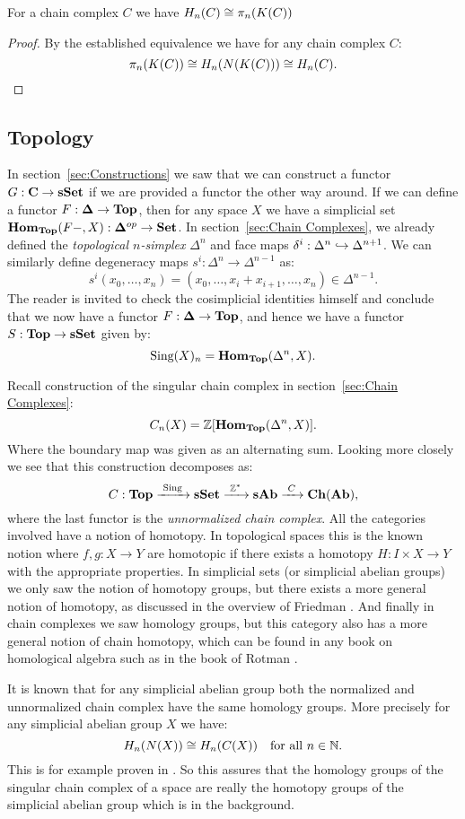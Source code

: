 \begin{corollary}
	For a chain complex $C$ we have $H_n(C) \cong \pi_n(K(C))$
\end{corollary}
\begin{proof}
	By the established equivalence we have for any chain complex $C$:
	$$ \pi_n(K(C)) \cong H_n(N(K(C))) \cong H_n(C). $$
\end{proof}

\subsection{Topology}
In section~\ref{sec:Constructions} we saw that we can construct a functor $G: \mathbf{C} \to \mathbf{sSet}$ if we are provided a functor the other way around. If we can define a functor $F: \mathbf{\Delta} \to \mathbf{Top}$, then for any space $X$ we have a simplicial set $\mathbf{Hom}_{\mathbf{Top}}(F-, X): \mathbf{\Delta}^{op} \to \mathbf{Set}$. In section~\ref{sec:Chain Complexes}, we already defined the \emph{topological $n$-simplex} $\Delta^n$ and face maps $\delta^i : \Delta^n \hookrightarrow \Delta^{n+1}$. We can similarly define degeneracy maps $s^i: \Delta^n \to \Delta^{n-1}$ as:
$$ s^i(x_0, \ldots, x_n) = (x_0, \ldots, x_i + x_{i+1}, \ldots, x_n) \in \Delta^{n-1}. $$
The reader is invited to check the cosimplicial identities himself and conclude that we now have a functor $F: \mathbf{\Delta} \to \mathbf{Top}$, and hence we have a functor $S: \mathbf{Top} \to \mathbf{sSet}$ given by:
$$ \text{Sing}(X)_n = \mathbf{Hom}_{\mathbf{Top}}(\Delta^n, X). $$

Recall construction of the singular chain complex in section~\ref{sec:Chain Complexes}:
$$ C_n(X) = \mathbb{Z}[\mathbf{Hom}_{\mathbf{Top}}(\Delta^n, X)]. $$
Where the boundary map was given as an alternating sum. Looking more closely we see that this construction decomposes as:
$$ C: \mathbf{Top} \xrightarrow{\,\,{\text{Sing}}\,\,} \mathbf{sSet} \xrightarrow{\,\,{\mathbb{Z}^\ast}\,\,} \mathbf{sAb} \xrightarrow{\,\,{C}\,\,} \mathbf{Ch}(\mathbf{Ab}), $$
where the last functor is the \emph{unnormalized chain complex}. All the categories involved have a notion of homotopy. In topological spaces this is the known notion where $f, g:X \to Y$ are homotopic if there exists a homotopy $H:I \times X \to Y$ with the appropriate properties. In simplicial sets (or simplicial abelian groups) we only saw the notion of homotopy groups, but there exists a more general notion of homotopy, as discussed in the overview of Friedman \cite{friedman}. And finally in chain complexes we saw homology groups, but this category also has a more general notion of chain homotopy, which can be found in any book on homological algebra such as in the book of Rotman \cite{rotman}.

It is known that for any simplicial abelian group both the normalized and unnormalized chain complex have the same homology groups. More precisely for any simplicial abelian group $X$ we have:
$$ H_n(N(X)) \cong H_n(C(X)) \quad\text{for all } n \in \mathbb{N}. $$
This is for example proven in \cite[Theorem 4.1]{eilenberg}. So this assures that the homology groups of the singular chain complex of a space are really the homotopy groups of the simplicial abelian group which is in the background.
